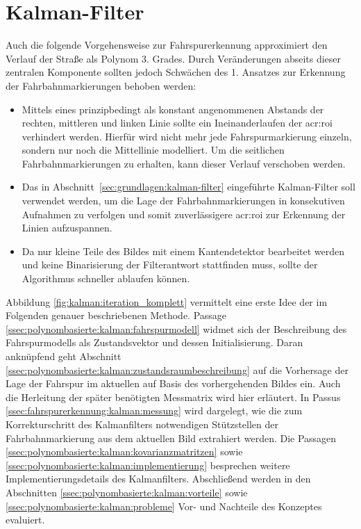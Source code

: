 \section{Kalman-Filter \dcsecondauthorshort}
\label{sec:fahrspurerkennung_kalman}
Auch die folgende Vorgehensweise zur Fahrspurerkennung approximiert den Verlauf der Straße als Polynom 3. Grades. Durch Veränderungen abseits dieser zentralen Komponente sollten jedoch Schwächen des 1. Ansatzes zur Erkennung der Fahrbahnmarkierungen behoben werden:
\begin{itemize}
\item Mittels eines prinzipbedingt als konstant angenommenen Abstands der rechten, mittleren und linken Linie sollte ein \glqq Ineinanderlaufen\grqq{} der \gls{acr:roi}
verhindert werden. Hierfür wird nicht mehr jede Fahrspurmarkierung einzeln, sondern nur noch die Mittellinie modelliert. Um die seitlichen Fahrbahnmarkierungen zu erhalten, kann dieser Verlauf verschoben werden.
\item Das in Abschnitt~\ref{sec:grundlagen:kalman-filter} eingeführte Kalman-Filter soll verwendet werden, um die Lage der Fahrbahnmarkierungen in konsekutiven Aufnahmen zu verfolgen und somit zuverlässigere \gls{acr:roi} zur Erkennung der Linien aufzuspannen.
\item Da nur kleine Teile des Bildes mit einem Kantendetektor bearbeitet werden und keine Binarisierung der Filterantwort stattfinden muss, sollte der Algorithmus schneller ablaufen können.
\end{itemize}
Abbildung \ref{fig:kalman:iteration_komplett} vermittelt eine erste Idee der im Folgenden genauer beschriebenen Methode.
Passage \ref{ssec:polynombasierte:kalman:fahrspurmodell} widmet sich der Beschreibung des Fahrspurmodells als Zustandsvektor und dessen Initialisierung. Daran anknüpfend geht Abschnitt \ref{ssec:polynombasierte:kalman:zustandsraumbeschreibung} auf die Vorhersage der Lage der Fahrspur im aktuellen auf Basis des vorhergehenden Bildes ein. Auch die Herleitung der später benötigten Messmatrix wird hier erläutert.
In Passus \ref{ssec:fahrspurerkennung:kalman:messung} wird dargelegt, wie die zum Korrekturschritt des Kalmanfilters notwendigen Stützstellen der Fahrbahnmarkierung aus dem aktuellen Bild extrahiert werden. Die Passagen \ref{ssec:polynombasierte:kalman:kovarianzmatritzen} sowie \ref{ssec:polynombasierte:kalman:implementierung} besprechen weitere Implementierungsdetails des Kalmanfilters. Abschließend werden in den Abschnitten \ref{ssec:polynombasierte:kalman:vorteile} sowie \ref{ssec:polynombasierte:kalman:probleme} Vor- und Nachteile des Konzeptes evaluiert.

